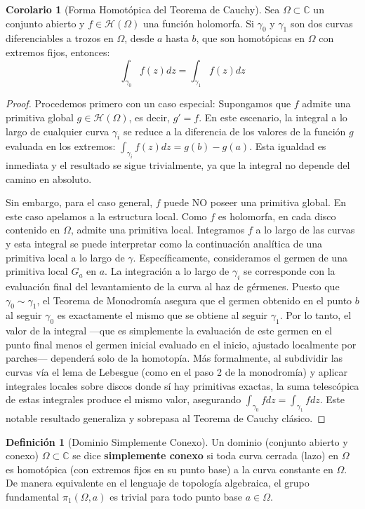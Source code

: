 \documentclass[11pt,a4paper]{article}
\theoremstyle{definition}
\newtheorem{definicion}{Definición}[section]
\newtheorem{corolario}{Corolario}[section]
\theoremstyle{remark}
\numberwithin{equation}{section}
\begin{document}
\begin{corolario}[Forma Homotópica del Teorema de Cauchy]
Sea $\Omega \subset \mathbb{C}$ un conjunto abierto y $f \in \mathcal{H}(\Omega)$ una función holomorfa. Si $\gamma_0$ y $\gamma_1$ son dos curvas diferenciables a trozos en $\Omega$, desde $a$ hasta $b$, que son homotópicas en $\Omega$ con extremos fijos, entonces:
$$ \int_{\gamma_0} f(z) dz = \int_{\gamma_1} f(z) dz $$
\end{corolario}
\begin{proof}
Procedemos primero con un caso especial: Supongamos que $f$ admite una primitiva global $g \in \mathcal{H}(\Omega)$, es decir, $g' = f$. En este escenario, la integral a lo largo de cualquier curva $\gamma_i$ se reduce a la diferencia de los valores de la función $g$ evaluada en los extremos: $\int_{\gamma_i} f(z) dz = g(b) - g(a)$. Esta igualdad es inmediata y el resultado se sigue trivialmente, ya que la integral no depende del camino en absoluto.

Sin embargo, para el caso general, $f$ puede NO poseer una primitiva global. En este caso apelamos a la estructura local. Como $f$ es holomorfa, en cada disco contenido en $\Omega$, admite una primitiva local. Integramos $f$ a lo largo de las curvas y esta integral se puede interpretar como la continuación analítica de una primitiva local a lo largo de $\gamma$.
Específicamente, consideramos el germen de una primitiva local $G_a$ en $a$. La integración a lo largo de $\gamma_i$ se corresponde con la evaluación final del levantamiento de la curva al haz de gérmenes. Puesto que $\gamma_0 \sim \gamma_1$, el Teorema de Monodromía asegura que el germen obtenido en el punto $b$ al seguir $\gamma_0$ es exactamente el mismo que se obtiene al seguir $\gamma_1$. Por lo tanto, el valor de la integral ---que es simplemente la evaluación de este germen en el punto final menos el germen inicial evaluado en el inicio, ajustado localmente por parches--- dependerá solo de la homotopía. Más formalmente, al subdividir las curvas vía el lema de Lebesgue (como en el paso 2 de la monodromía) y aplicar integrales locales sobre discos donde sí hay primitivas exactas, la suma telescópica de estas integrales produce el mismo valor, asegurando $\int_{\gamma_0} f dz = \int_{\gamma_1} f dz$. Este notable resultado generaliza y sobrepasa al Teorema de Cauchy clásico.
\end{proof}

\begin{definicion}[Dominio Simplemente Conexo]
Un dominio (conjunto abierto y conexo) $\Omega \subset \mathbb{C}$ se dice \textbf{simplemente conexo} si toda curva cerrada (lazo) en $\Omega$ es homotópica (con extremos fijos en su punto base) a la curva constante en $\Omega$. De manera equivalente en el lenguaje de topología algebraica, el grupo fundamental $\pi_1(\Omega, a)$ es trivial para todo punto base $a \in \Omega$.
\end{definicion}
\end{document}
